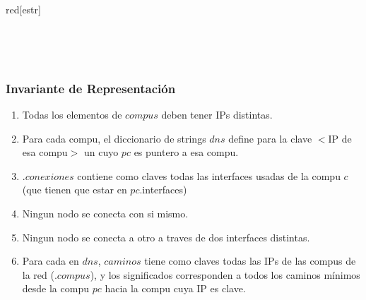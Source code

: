     \begin{Estructura}{red}[estr]

      \begin{Tupla}[estr]
      \end{Tupla}

      ~

      \begin{Tupla}[nodoRed]
      \end{Tupla}

      ~

    	\begin{Tupla}[compu]
    	\end{Tupla}

    \end{Estructura}

\subsubsection{Invariante de Representación}
  \begin{enumerate}

  \item Todas los elementos de $compus$ deben tener IPs distintas.

  \item Para cada compu, el diccionario de strings $dns$ define para la clave $<$IP de esa compu$>$ un  cuyo $pc$ es puntero a esa compu.

  \item {}.$conexiones$ contiene como claves todas las
        interfaces usadas de la compu $c$ (que tienen que estar en $pc$.interfaces)

  \item Ningun nodo se conecta con si mismo.

  \item Ningun nodo se conecta a otro a traves de dos interfaces distintas.

  \item Para cada  en $dns$, $caminos$ tiene como claves todas las
        IPs de las compus de la red (.$compus$), y los significados corresponden a todos los caminos
        mínimos desde la compu $pc$ hacia la compu cuya IP es clave.

  \end{enumerate}

